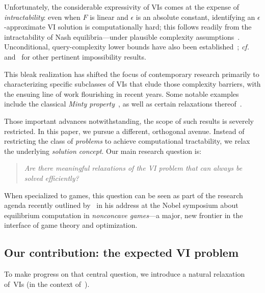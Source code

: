 Unfortunately, the considerable expressivity of VIs comes at the expense of \emph{intractability}: even when $F$ is linear and $\epsilon$ is an absolute constant, identifying an $\epsilon$-approximate VI solution is computationally hard; this follows readily from the intractability of Nash equilibria---under plausible complexity assumptions~\citep{Daskalakis08:Complexity,Chen09:Settling,Rubinstein16:Settling}. Unconditional, query-complexity lower bounds have also been established~\citep{Hirsch89:Exponential,Babichenko16:Query}; \emph{cf.}~\citet{Milionis23:Impossibility} and~\citet{Hart03:Uncoupled} for other pertinent impossibility results.

This bleak realization has shifted the focus of contemporary research primarily to characterizing specific subclasses of VIs that elude those complexity barriers, with the ensuing line of work flourishing in recent years. %
Some notable examples include the classical \emph{Minty property}~\citep{Facchinei03:Finite,Mertikopoulos19:Learning,Malitsky15:Projected,Goktas25:Tractable}, as well as certain relaxations thereof~\citep{Diakonikolas21:Efficient,Bohm23:Solving,Bauschke21:Generalized,Combettes04:Proximal,Gorbunov23:Convergence,Cai24:Accelerated,Alacaoglu23:Beyond,Pethick22:Escaping,Lee21:Fast,Patris24:Learning,Choudhury24:Single,Lee22:Semi,Anagnostides24}.

Those important advances notwithstanding, the scope of such results is severely restricted. In this paper, we pursue a different, orthogonal avenue. Instead of restricting the class of {\em problems} to achieve computational tractability, we relax the underlying {\em solution concept}. Our main research question is:
%
\begin{quote}
    \centering
    \emph{Are there meaningful relaxations of the VI problem that can always be solved efficiently?}
\end{quote}
%
When specialized to games, this question can be seen as part of the research agenda recently outlined by~\citet{Daskalakis22:Non} in his 
address at the Nobel symposium about equilibrium computation in \emph{nonconcave games}---a major, new frontier in the interface of game theory and optimization.

\subsection{Our contribution: the expected VI problem}

To make progress on that central question, we introduce a natural relaxation of~VIs (in the context of~).

